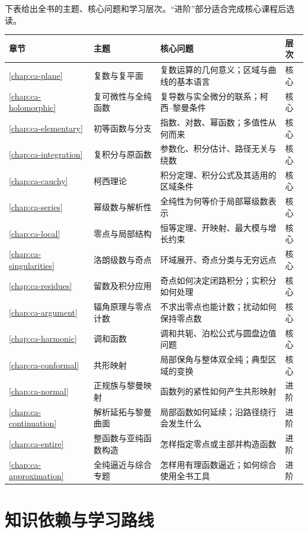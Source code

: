 \documentclass[UTF8,12pt,a4paper,fontset=fandol]{ctexbook}
\begin{document}
下表给出全书的主题、核心问题和学习层次。“进阶”部分适合完成核心课程后选读。

\begin{longtable}{@{}p{}p{}p{}p{}@{}}
\toprule
章节 & 主题 & 核心问题 & 层次 \\
\midrule
\endhead
\ref{chap:ca-plane} & 复数与复平面 & 复数运算的几何意义；区域与曲线的基本语言 & 核心 \\
\ref{chap:ca-holomorphic} & 复可微性与全纯函数 & 复导数与实全微分的联系；柯西--黎曼条件 & 核心 \\
\ref{chap:ca-elementary} & 初等函数与分支 & 指数、对数、幂函数；多值性从何而来 & 核心 \\
\ref{chap:ca-integration} & 复积分与原函数 & 参数化、积分估计、路径无关与绕数 & 核心 \\
\ref{chap:ca-cauchy} & 柯西理论 & 积分定理、积分公式及其适用的区域条件 & 核心 \\
\ref{chap:ca-series} & 幂级数与解析性 & 全纯性为何等价于局部幂级数表示 & 核心 \\
\ref{chap:ca-local} & 零点与局部结构 & 恒等定理、开映射、最大模与增长约束 & 核心 \\
\ref{chap:ca-singularities} & 洛朗级数与奇点 & 环域展开、奇点分类与无穷远点 & 核心 \\
\ref{chap:ca-residues} & 留数及积分应用 & 奇点如何决定闭路积分；实积分如何处理 & 核心 \\
\ref{chap:ca-argument} & 辐角原理与零点计数 & 不求出零点也能计数；扰动如何保持零点数 & 核心 \\
\ref{chap:ca-harmonic} & 调和函数 & 调和共轭、泊松公式与圆盘边值问题 & 核心 \\
\ref{chap:ca-conformal} & 共形映射 & 局部保角与整体双全纯；典型区域的变换 & 核心 \\
\ref{chap:ca-normal} & 正规族与黎曼映射 & 函数列的紧性如何产生共形映射 & 进阶 \\
\ref{chap:ca-continuation} & 解析延拓与黎曼曲面 & 局部函数如何延续；沿路径绕行会发生什么 & 进阶 \\
\ref{chap:ca-entire} & 整函数与亚纯函数构造 & 怎样指定零点或主部并构造函数 & 进阶 \\
\ref{chap:ca-approximation} & 全纯逼近与综合专题 & 怎样用有理函数逼近；如何综合使用全书工具 & 进阶 \\
\bottomrule
\end{longtable}

\section{知识依赖与学习路线}
\end{document}

